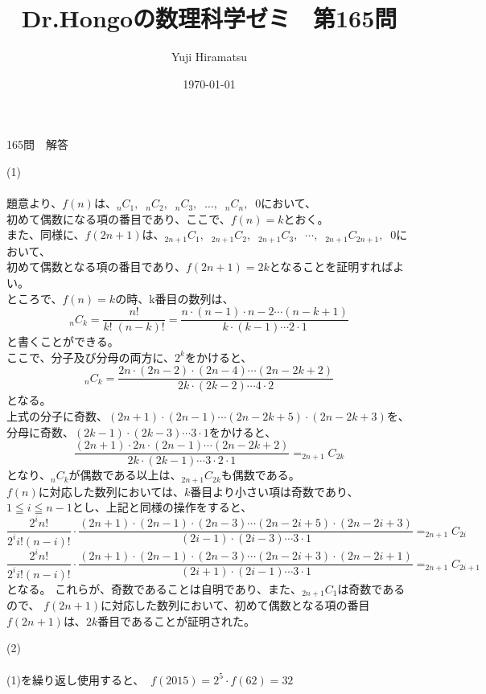 \documentclass[a4j,10pt,oneside,openany]{jsbook}
\title{{\Huge \textbf{Dr.Hongoの数理科学ゼミ　第165問}}\\}
\author{Yuji Hiramatsu}
\date{\today}
\begin{document}
%
%
\maketitle
%
%


{\Huge 165問　解答}

\vspace{3\baselineskip}

{\Large (1)}
\\
\\
題意より、$f(n)$は、$_{n}C_{1},\;\; _{n}C_{2},\;\; _{n}C_{3},\;\; \dots ,\;\; _{n}C_{n},\;\; 0 $において、\\
初めて偶数になる項の番目であり、ここで、$f(n)=k$とおく。\\
また、同様に、$f(2n+1)$は、$_{2n+1}C_{1},\;\; _{2n+1}C_{2},\;\; _{2n+1}C_{3},\;\; \cdots ,\;\; _{2n+1}C_{2n+1},\;\; 0 $において、\\
初めて偶数となる項の番目であり、$f(2n+1)=2k$となることを証明すればよい。\\
ところで、$f(n)=k$の時、k番目の数列は、
\[ _{n}C_{k} = \frac{n!}{k! \; (n-k)!} = \frac{n \cdot (n-1) \cdot {n-2} \cdots (n-k+1)}{k \cdot (k-1) \cdots 2 \cdot 1} \]
と書くことができる。\\
ここで、分子及び分母の両方に、$2^{k}$をかけると、
\[ _{n}C_{k} = \frac{2n \cdot (2n-2) \cdot (2n-4) \cdots (2n-2k+2)}{2k \cdot (2k-2) \cdots 4 \cdot 2} \]
となる。\\
上式の分子に奇数、$(2n+1) \cdot (2n-1) \cdots (2n-2k+5) \cdot (2n-2k+3)$を、\\
分母に奇数、$(2k-1) \cdot (2k-3) \cdots 3 \cdot 1$をかけると、\\
\[ \frac{(2n+1) \cdot 2n \cdot (2n-1) \cdots (2n-2k+2)}{2k \cdot (2k-1) \cdots 3 \cdot 2 \cdot 1}=_{2n+1}C_{2k} \]
となり、$_{n}C_{k}$が偶数である以上は、$_{2n+1}C_{2k}$も偶数である。\\
$f(n)$に対応した数列においては、$k$番目より小さい項は奇数であり、$1\leqq i \leqq n-1$とし、上記と同様の操作をすると、\\
\[\frac{2^{i}n!}{2^{i}i!(n-i)!}\cdot\frac{(2n+1) \cdot (2n-1) \cdot (2n-3) \cdots (2n-2i+5) \cdot (2n-2i+3)}{(2i-1) \cdot (2i-3) \cdots 3 \cdot 1}= _{2n+1}C_{2i}\]
\[\frac{2^{i}n!}{2^{i}i!(n-i)!}\cdot\frac{(2n+1) \cdot (2n-1) \cdot (2n-3) \cdots (2n-2i+3) \cdot (2n-2i+1)}{(2i+1) \cdot (2i-1) \cdots 3 \cdot 1}= _{2n+1}C_{2i+1}\]
となる。
これらが、奇数であることは自明であり、また、$_{2n+1}C_{1}$は奇数であるので、
$f(2n+1)$に対応した数列において、初めて偶数となる項の番目$f(2n+1)$は、$2k$番目であることが証明された。

\vspace{1\baselineskip}

{\Large (2)}
\\
\\
(1)を繰り返し使用すると、$ \;\;  f(2015)= 2^{5} \cdot f(62) = 32 $


\newpage
%
%
\end{document}
